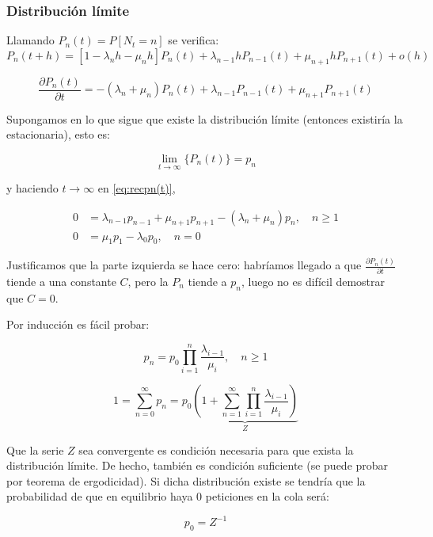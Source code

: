 \documentclass[8pt]{beamer}
\begin{document}
  \begin{frame}\frametitle{Distribución límite}
  Llamando $P_n(t) = P[N_t = n]$ se verifica:
    \[P_n(t+h) = [1-\lambda_n h -\mu_n h] P_n(t) + \lambda_{n-1} h P_{n-1}(t) + \mu_{n+1} h P_{n+1}(t) + o(h)\]
    
    \begin{equation}
     \frac{\partial P_n(t)}{\partial t} = -(\lambda_n + \mu_n) P_n(t) + \lambda_{n-1}P_{n-1}(t) + \mu_{n+1}P_{n+1}(t)
     \label{eq:recpn(t)}
    \end{equation}

    Supongamos en lo que sigue que existe la distribución límite (entonces existiría la estacionaria), esto es:
    
    \begin{equation}
     \lim_{t\rightarrow \infty}\{P_n(t)\} = p_n     
    \end{equation}

    y haciendo $t\rightarrow \infty$ en \eqref{eq:recpn(t)},
	
	\begin{align*}
	0 &= \lambda_{n-1} p_{n-1} + \mu_{n+1} p_{n+1} - (\lambda_n + \mu_n) p_n, \quad n\ge 1\\
	0 &= \mu_1 p_1 -\lambda_0 p_0, \quad n=0
	\end{align*}
	
    Justificamos que la parte izquierda se hace cero: habríamos llegado a que $\frac{\partial P_n(t)}{\partial t}$ tiende a una constante $C$,
    pero la $P_n$ tiende a $p_n$, luego no es difícil demostrar que $C=0$.
  \end{frame}

  \begin{frame}
  Por inducción es fácil probar:
  
  \begin{equation}
    p_n = p_0 \prod_{i=1}^n \frac{\lambda_{i-1}}{\mu_i}, \quad n\ge 1
    \label{pn}
  \end{equation}
  
   \begin{equation}
    1 = \sum_{n=0}^{\infty} p_n = p_0 \underbrace{\left(1 + \sum_{n=1}^{\infty} \prod_{i=1}^n \frac{\lambda_{i-1}}{\mu_i} \right)}_{Z}
    \label{eq:stabseries}
   \end{equation}

   Que la serie $Z$ sea convergente es condición necesaria para que exista la distribución límite. 
   De hecho, también es condición suficiente (se puede probar por teorema de ergodicidad). Si dicha distribución existe se tendría que la probabilidad de
   que en equilibrio haya $0$ peticiones en la cola será:
   
   \begin{equation}
    p_0 = Z^{-1}
    \label{p0}
   \end{equation}

  \end{frame}
\end{document}
